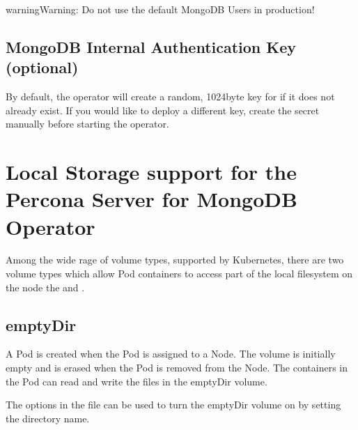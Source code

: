 \documentclass[letterpaper,10pt,english]{sphinxmanual}
\begin{document}
\begin{sphinxadmonition}{warning}{Warning:}
Do not use the default MongoDB Users in production!
\end{sphinxadmonition}


\section{MongoDB Internal Authentication Key (optional)}
\label{\detokenize{users:users-internal-authentication-key}}\label{\detokenize{users:id5}}
 

 

By default, the operator will create a random, 1024\sphinxhyphen{}byte key for
if it does not already exist. If you would like to deploy a different
key, create the secret manually before starting the operator.


\chapter{Local Storage support for the Percona Server for MongoDB Operator}
\label{\detokenize{storage:local-storage-support-for-the-percona-server-for-mongodb-operator}}\label{\detokenize{storage::doc}}
Among the wide rage of volume types, supported by Kubernetes, there are
two volume types which allow Pod containers to access part of the local filesystem on
the node the  and .


\section{emptyDir}
\label{\detokenize{storage:emptydir}}
A Pod  is created when the Pod is assigned to a Node. The volume is initially empty and is erased when the Pod is removed from the Node. The containers in the Pod can read and write the files in the emptyDir volume.

The  options in the
file can be used to turn the emptyDir volume on by setting the directory
name.
\end{document}
